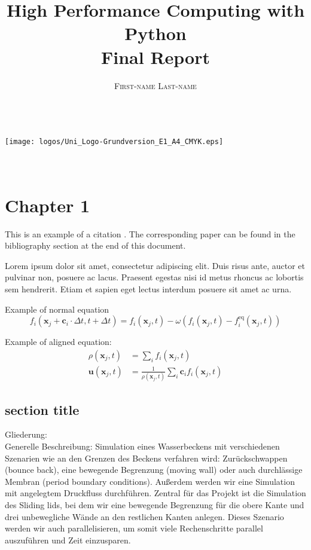 \documentclass[a4paper,11pt]{report}
\title{\Huge \textbf{High Performance Computing with Python} \vspace{4mm} \\ \huge Final Report}
\author{\textsc{First-name Last-name} \\ \vspace{3mm}\text{matriculation number}  \\
\vspace{3mm}\text{email-address}}
\begin{document}
\makeatletter
    \begin{titlepage}
        \begin{center}
            \texttt{[image: logos/Uni\_Logo-Grundversion\_E1\_A4\_CMYK.eps]}\\[4ex]
            {\huge \bfseries  \@title }\\[2ex] 
            {\LARGE  \@author}\\[30ex] 
            {\large \@date}
        \end{center}
    \end{titlepage}
\makeatother
\thispagestyle{empty}
\newpage



\tableofcontents


\chapter{Chapter 1}

This is an example of a citation \cite{timm2016lattice}. The corresponding paper can be found in the bibliography section at the end of this document.

Lorem ipsum dolor sit amet, consectetur adipiscing elit. Duis risus ante, auctor et pulvinar non, posuere ac lacus. Praesent egestas nisi id metus rhoncus ac lobortis sem hendrerit. Etiam et sapien eget lectus interdum posuere sit amet ac urna.

Example of normal equation
\begin{equation}\label{eq:LBE}
f_i(\mathbf{x}_j+\mathbf{c}_i\cdot\Delta t,t+\Delta t)=f_i(\mathbf{x}_j,t)
-\omega \left( f_i(\mathbf{x}_j,t)-f_i^\text{eq}(\mathbf{x}_j,t) \right)
\end{equation}

Example of aligned equation:
\begin{align}
  \rho(\mathbf{x}_j, t) &= \sum_i f_i(\mathbf{x}_j, t) \\
  \mathbf{u}(\mathbf{x}_j, t) &= \frac{1}{ \rho(\mathbf{x}_j, t)}
    \sum_i \mathbf{c}_i f_i(\mathbf{x}_j, t)
\end{align}

\section{section title}
Gliederung:\\
Generelle Beschreibung: Simulation eines Wasserbeckens mit verschiedenen Szenarien wie an den Grenzen des Beckens verfahren wird: Zurückschwappen (bounce back), eine bewegende Begrenzung (moving wall) oder auch durchlässige Membran (period boundary conditions). Außerdem werden wir eine Simulation mit angelegtem Druckfluss durchführen. Zentral für das Projekt ist die Simulation  des Sliding lids, bei dem wir eine bewegende Begrenzung für die obere Kante und drei unbewegliche Wände an den restlichen Kanten anlegen. Dieses Szenario werden wir auch parallelisieren, um somit viele Rechenschritte parallel auszuführen und Zeit einzusparen.\\
\end{document}

